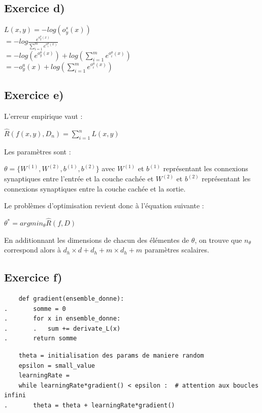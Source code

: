 \documentclass[a4paper,10pt]{article}
\begin{document}
\subsection{Exercice d)}

$ L(x,y) = -log  (o^{s}_{y}(x)) $
\\[6pt]
$= -log \frac{e^{o^{a}_{y}(x)}}{\sum_{i=1}^{m} e^{o^{a}_{i}(x)}}$ 
\\[6pt]
$= -log(e^{o^{a}_{y}(x)}) +log(\sum_{i=1}^{m} e^{o^{a}_{i}(x)})  $
\\[6pt]
$ = -o^{a}_{y}(x) + log(\sum_{i=1}^{m} e^{o^{a}_{i}(x)})$

\subsection{Exercice e)} 

L'erreur empirique vaut :

$\widehat{R}(f(x,y),D_{n}) = \sum_{i=1}^{n} L(x,y)$

Les paramètres sont :

$ \theta = \{ W^{(1)},W^{(2)},b^{(1)},b^{(2)} \}$ avec $W^{(1)}$ et $b^{(1)}$ représentant les connexions synaptiques entre l'entrée et la couche cachée et $W^{(2)}$ et $b^{(2)}$ représentant les connexions synaptiques entre la couche cachée et la sortie.

Le problèmes d'optimisation revient donc à l'équation suivante :

$\theta^{*} = argmin_{\theta} \widehat{R}(f,D) $

En additionnant les dimensions de chacun des élémentes de $\theta$, on trouve que $n_{\theta}$ correspond alors à $d_{h} \times d + d_{h} + m \times d_{h} + m$ paramètres scalaires.

\subsection{Exercice f)} 

\begin{verbatim}
	def gradient(ensemble_donne):
.		somme = 0
.		for x in ensemble_donne:
.		.	sum += derivate_L(x)
.		return somme
\end{verbatim}

\begin{verbatim}
	theta = initialisation des params de maniere random	
	epsilon = small_value
	learningRate =
	while learningRate*gradient() < epsilon :  # attention aux boucles infini
.		theta = theta + learningRate*gradient()
\end{verbatim}
\end{document}
